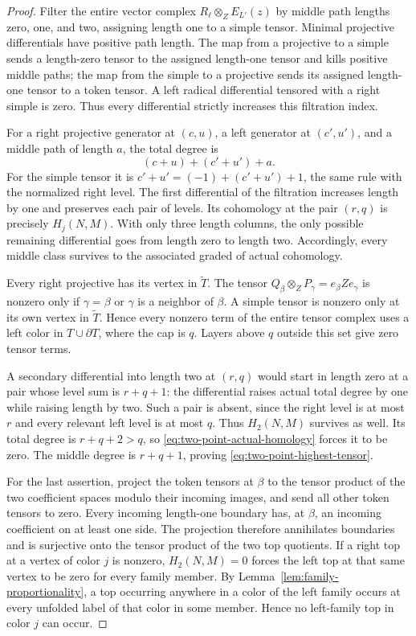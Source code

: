 \begin{proof}
Filter the entire vector complex
\(R_\ell\otimes_Z E_{L'}(z)\) by middle path lengths zero, one, and
two, assigning length one to a simple tensor.  Minimal projective
differentials have positive path length.  The map from a projective
to a simple sends a length-zero tensor to the assigned length-one
tensor and kills positive middle paths; the map from the simple to
a projective sends its assigned length-one tensor to a token tensor.
A left radical differential tensored with a right simple is zero.
Thus every differential strictly increases this filtration index.

For a right projective generator at \((c,u)\), a left generator at
\((c',u')\), and a middle path of length \(a\), the total degree is
\[
 (c+u)+(c'+u')+a.
\]
For the simple tensor it is \(c'+u'=(-1)+(c'+u')+1\), the same rule
with the normalized right level.  The first differential of the
filtration increases length by one and preserves each pair of
levels.  Its cohomology at the pair \((r,q)\) is precisely
\(H_j(N,M)\).  With only three length columns, the only possible
remaining differential goes from length zero to length two.
Accordingly, every middle class survives to the associated graded
of actual cohomology.

Every right projective has its vertex in \(\widetilde T\).
The tensor \(Q_\beta\otimes_Z P_\gamma=e_\beta Ze_\gamma\) is
nonzero only if \(\gamma=\beta\) or \(\gamma\) is a neighbor of
\(\beta\).  A simple tensor is nonzero only at its own vertex in
\(\widetilde T\).  Hence every nonzero term of the entire tensor
complex uses a left color in \(T\cup\partial T\), where the cap is
\(q\).  Layers above \(q\) outside this set give zero tensor terms.

A secondary differential into length two at \((r,q)\) would start
in length zero at a pair whose level sum is \(r+q+1\): the
differential raises actual total degree by one while raising length
by two.  Such a pair is absent, since the right level is at most
\(r\) and every relevant left level is at most \(q\).  Thus
\(H_2(N,M)\) survives as well.  Its total degree is
\(r+q+2>q\), so \eqref{eq:two-point-actual-homology} forces it to be
zero.  The middle degree is \(r+q+1\), proving
\eqref{eq:two-point-highest-tensor}.

For the last assertion, project the token tensors at \(\beta\) to
the tensor product of the two coefficient spaces modulo their
incoming images, and send all other token tensors to zero.
Every incoming length-one boundary has, at \(\beta\), an incoming
coefficient on at least one side.  The projection therefore
annihilates boundaries and is surjective onto the tensor product of
the two top quotients.  If a right top at a vertex of color \(j\)
is nonzero, \(H_2(N,M)=0\) forces the left top at that same vertex
to be zero for every family member.  By
Lemma~\ref{lem:family-proportionality}, a top occurring anywhere in
a color of the left family occurs at every unfolded label of that
color in some member.  Hence no left-family top in color \(j\)
can occur.
\end{proof}

